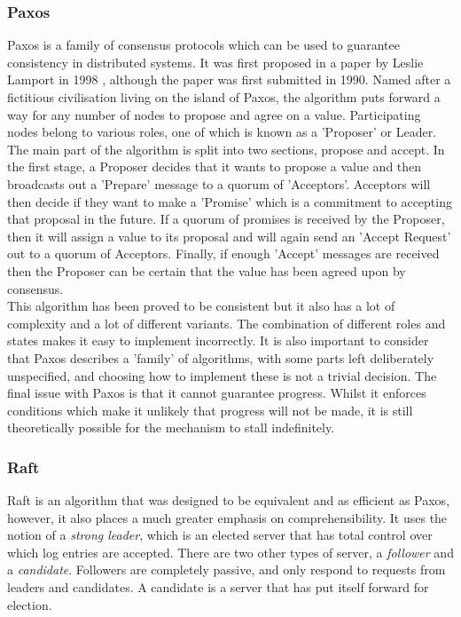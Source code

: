 \documentclass[12pt,a4paper,twoside,openright]{report}
\begin{document}
			\subsubsection*{Paxos}
			Paxos is a family of consensus protocols which can be used to guarantee consistency in distributed systems. 
			It was first proposed in a paper by Leslie Lamport in 1998 \cite{Paxos}, although the paper was first submitted in 1990.
			Named after a fictitious civilisation living on the island of Paxos, the algorithm puts forward a way for any number of nodes to propose and agree on a value.
			Participating nodes belong to various roles, one of which is known as a 'Proposer' or Leader.\\

			The main part of the algorithm is split into two sections, propose and accept.
			In the first stage, a Proposer decides that it wants to propose a value and then broadcasts out a 'Prepare' message to a quorum of 'Acceptors'.
			Acceptors will then decide if they want to make a 'Promise' which is a commitment to accepting that proposal in the future. 
			If a quorum of promises is received by the Proposer, then it will assign a value to its proposal and will again send an 'Accept Request' out to a quorum of Acceptors.
			Finally, if enough 'Accept' messages are received then the Proposer can be certain that the value has been agreed upon by consensus.\\

			This algorithm has been proved to be consistent but it also has a lot of complexity and a lot of different variants. 
			The combination of different roles and states makes it easy to implement incorrectly.
			It is also important to consider that Paxos describes a 'family' of algorithms, with some parts left deliberately unspecified, and choosing how to implement these is not a trivial decision.
			The final issue with Paxos is that it cannot guarantee progress.
			Whilst it enforces conditions which make it unlikely that progress will not be made, it is still theoretically possible for the mechanism to stall indefinitely.

			\subsubsection*{Raft}
			Raft \cite{Raft} is an algorithm that was designed to be equivalent and as efficient as Paxos, however, it also places a much greater emphasis on comprehensibility.
			It uses the notion of a \textit{strong leader}, which is an elected server that has total control over which log entries are accepted.
			There are two other types of server, a \textit{follower} and a \textit{candidate}. 
			Followers are completely passive, and only respond to requests from leaders and candidates. 
			A candidate is a server that has put itself forward for election.\\
\end{document}
